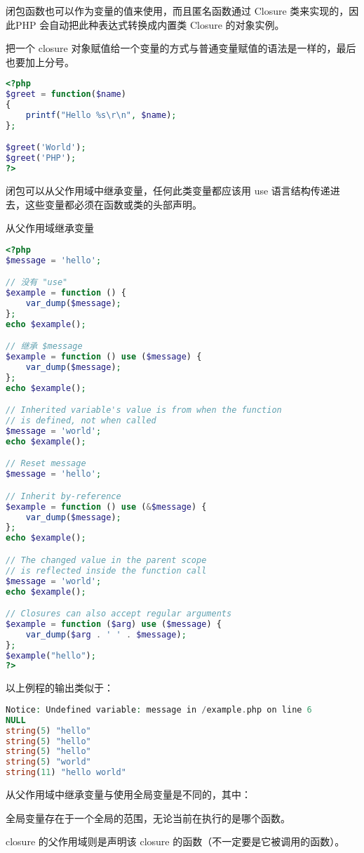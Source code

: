 闭包函数也可以作为变量的值来使用，而且匿名函数通过 Closure 类来实现的，因此PHP 会自动把此种表达式转换成内置类 Closure 的对象实例。

把一个 closure 对象赋值给一个变量的方式与普通变量赋值的语法是一样的，最后也要加上分号。

\begin{lstlisting}[language=PHP]
<?php
$greet = function($name)
{
    printf("Hello %s\r\n", $name);
};

$greet('World');
$greet('PHP');
?>
\end{lstlisting}

闭包可以从父作用域中继承变量，任何此类变量都应该用 use 语言结构传递进去，这些变量都必须在函数或类的头部声明。

\begin{example}
从父作用域继承变量
\begin{lstlisting}[language=PHP]
<?php
$message = 'hello';

// 没有 "use"
$example = function () {
    var_dump($message);
};
echo $example();

// 继承 $message
$example = function () use ($message) {
    var_dump($message);
};
echo $example();

// Inherited variable's value is from when the function
// is defined, not when called
$message = 'world';
echo $example();

// Reset message
$message = 'hello';

// Inherit by-reference
$example = function () use (&$message) {
    var_dump($message);
};
echo $example();

// The changed value in the parent scope
// is reflected inside the function call
$message = 'world';
echo $example();

// Closures can also accept regular arguments
$example = function ($arg) use ($message) {
    var_dump($arg . ' ' . $message);
};
$example("hello");
?>
\end{lstlisting}
\end{example}

以上例程的输出类似于：

\begin{lstlisting}[language=PHP]
Notice: Undefined variable: message in /example.php on line 6
NULL
string(5) "hello"
string(5) "hello"
string(5) "hello"
string(5) "world"
string(11) "hello world"
\end{lstlisting}

从父作用域中继承变量与使用全局变量是不同的，其中：

\begin{compactitem}
\item 全局变量存在于一个全局的范围，无论当前在执行的是哪个函数。
\item closure 的父作用域则是声明该 closure 的函数（不一定要是它被调用的函数）。
\end{compactitem}



